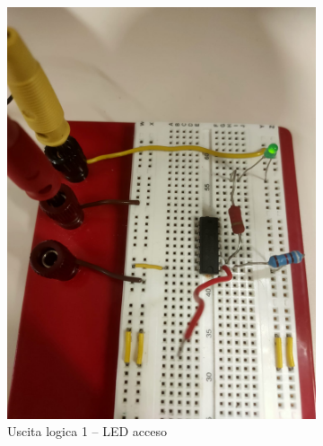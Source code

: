 \documentclass[a4paper,12pt]{article}
\begin{document}
\begin{figure}[H]
    \centering
    \begin{subfigure}[b]{0.45\textwidth}
        \centering
        \includegraphics[width=\textwidth]{immagini/inverter/on.png}
        \caption{Uscita logica 1 – LED acceso}
        \label{fig:led_on}
    \end{subfigure}
    \hfill
    \begin{subfigure}[b]{0.45\textwidth}
        \centering

\end{subfigure}
\end{figure}
\end{document}
